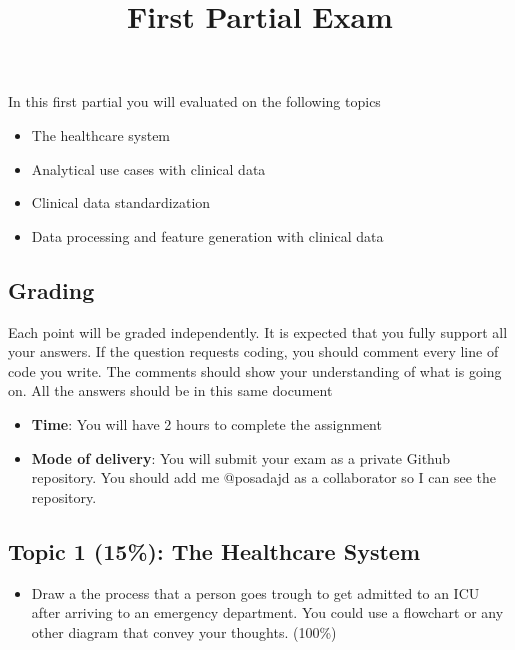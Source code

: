 \documentclass[
]{article}
\title{First Partial Exam}
\author{}
\date{\vspace{-2.5em}}
\providecommand{\tightlist}{%
  \setlength{\itemsep}{0pt}\setlength{\parskip}{0pt}}
\begin{document}
\maketitle

In this first partial you will evaluated on the following topics

\begin{itemize}
\tightlist
\item
  The healthcare system
\item
  Analytical use cases with clinical data
\item
  Clinical data standardization
\item
  Data processing and feature generation with clinical data
\end{itemize}

\hypertarget{grading}{%
\subsection{Grading}\label{grading}}

Each point will be graded independently. It is expected that you fully
support all your answers. If the question requests coding, you should
comment every line of code you write. The comments should show your
understanding of what is going on. All the answers should be in this
same document

\begin{itemize}
\tightlist
\item
  \textbf{Time}: You will have 2 hours to complete the assignment
\item
  \textbf{Mode of delivery}: You will submit your exam as a private
  Github repository. You should add me @posadajd as a collaborator so I
  can see the repository.
\end{itemize}

\hypertarget{topic-1-15-the-healthcare-system}{%
\subsection{Topic 1 (15\%): The Healthcare
System}\label{topic-1-15-the-healthcare-system}}

\begin{itemize}
\tightlist
\item
  Draw a the process that a person goes trough to get admitted to an ICU
  after arriving to an emergency department. You could use a flowchart
  or any other diagram that convey your thoughts. (100\%)
\end{itemize}
\end{document}
